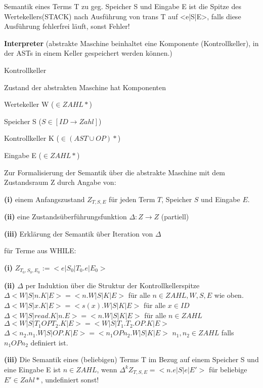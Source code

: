 \begin{compactitem}
Semantik eines Terms T zu geg. Speicher S und Eingabe E ist die Spitze des Wertekellers(STACK) nach Ausführung von trans T auf <e|S|E>, falls diese Ausführung fehlerfrei läuft, sonst Fehler!\\
	\item[\textbf{Interpreter}] (abstrakte Maschine beinhaltet eine Komponente (Kontrollkeller), in der ASTs in einem Keller gespeichert werden können.)
	\begin{compactitem}
		\item Kontrollkeller
		\item Zustand der abstrakten Maschine hat Komponenten
			\begin{compactitem}
				\item Wertekeller W ($\in ZAHL*$)
				\item Speicher S ($S \in [ID \rightarrow Zahl]$)
				\item Kontrollkeller K ($ \in (AST \cup OP)*$)
				\item Eingabe E ($\in ZAHL*$)
			\end{compactitem}
	\end{compactitem}
		Zur Formalisierung der Semantik über die abstrakte Maschine mit dem Zustandsraum Z durch Angabe von:
		\begin{compactitem}
			\item[\textbf{(i)}] einem Anfangszustand $Z_{T,S,E}$ für jeden Term $T$, Speicher $S$ und Eingabe $E$.
			\item[\textbf{(ii)}] eine Zustandsüberführungsfunktion $\Delta : Z \rightarrow Z$ (partiell)
			\item[\textbf{(iii)}] Erklärung der Semantik über Iteration von $\Delta$		
		\end{compactitem}
		für Terme aus WHILE:\\
			\begin{compactitem}
				\item[\textbf{(i)}]	$Z_{T_0,S_0,E_0} := <e|S_0|T_0.e|E_0>$
				\item[\textbf{(ii)}] $\Delta$ per Induktion über die Struktur der Kontrollkellerspitze\\
					$\Delta <W|S|n.K|E> = <n.W|S|K|E>$ für alle $n \in ZAHL, W,S,E$ wie oben.\\
					$\Delta <W|S|x.K|E> = <s(x).W|S|K|E>$ für alle $x \in ID$\\
					$\Delta <W|S|read.K|n.E> = <n.W|S|K|E>$ für alle $n \in ZAHL$\\
					$\Delta <W|S|T_1 OP T_2.K|E> = <W|S|T_1.T_2.OP.K|E>$ \\
					$\Delta <n_2.n_1.W|S|OP.K|E> = <n_1 OP n_2.W|S|K|E>$ $n_1, n_2 \in ZAHL$ falls $n_1 OP n_2$ definiert ist.\\			
				\item[\textbf{(iii)}] Die Semantik eines (beliebigen) Terms T im Bezug auf einem Speicher S und eine Eingabe E ist $n \in ZAHL$, wenn $\Delta^k Z_{T,S,E} = <n.e|S|e|E'>$ für beliebige $E' \in Zahl*$, undefiniert sonst!\\ 		
			\end{compactitem}		
\end{compactitem}

